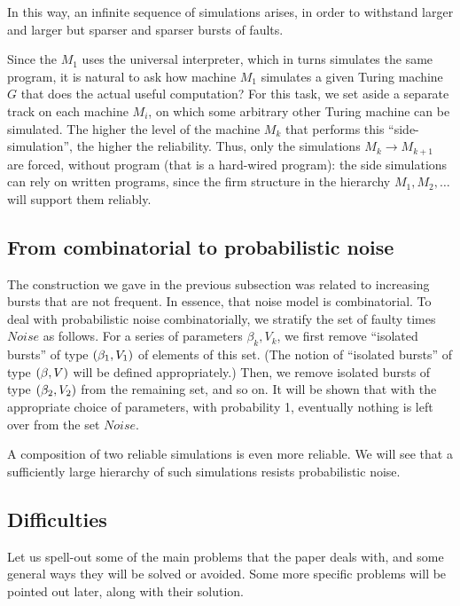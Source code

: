 \documentclass[12pt]{memoir}
\newcommand{\Noise}{\mathit{Noise}}
\begin{document}
In this way, an infinite sequence of simulations arises, in order
to withstand larger and larger but sparser and sparser bursts of faults.

Since the \( M_{1} \) uses the universal interpreter, which in turns
simulates the same program, it is natural to ask
how  machine \( M_{1} \) simulates a given Turing machine \( G \) that does the 
actual useful computation?
For this task, we set aside a separate track 
on each machine \( M_{i} \), on which some arbitrary other Turing machine can be
simulated.
The higher the level of the machine \( M_{k} \) that performs this
``side-simulation'', the higher the reliability.
Thus, only the simulations \( M_{k}\to M_{k+1} \) are forced, without program
(that is a hard-wired program):
the side simulations can rely on written programs, since the firm
structure in the hierarchy \( M_{1},M_{2},\dots \) will support them reliably.



\subsection{From combinatorial to probabilistic noise}

The construction we gave in the previous subsection
was related to increasing bursts that are not frequent.
In essence, that noise model is combinatorial.
To deal with probabilistic noise combinatorially,
we stratify the set of faulty times \( \Noise \) as follows.
For a series of parameters \( \beta_{k}, V_{k} \),
we first remove ``isolated bursts'' of type \( (\beta_{1},V_{1}) \) of elements of this set.
(The notion of ``isolated bursts'' of type \( (\beta,V) \)
will be defined appropriately.)
Then, we remove isolated bursts of type \( (\beta_{2},V_{2}) \) from the remaining set,
and so on.
It will be shown that with the appropriate choice of parameters, with probability 1,
eventually nothing is left over from the set \( \Noise \).

A composition of two reliable simulations is even more reliable.
We will see that a sufficiently large hierarchy of such
simulations resists probabilistic noise.


\subsection{Difficulties}\label{sec:novelties}

Let us spell-out some of the main problems that the paper deals with, 
and some general ways they will be solved or avoided.
Some more specific problems will be pointed out later, along with their solution.
\end{document}
